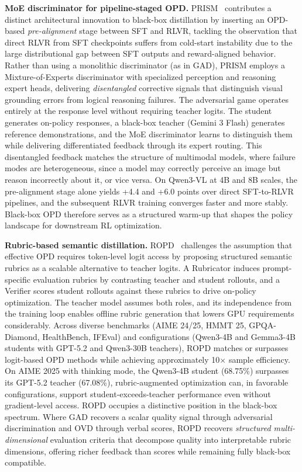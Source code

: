 \documentclass{article} %
\begin{document}
\textbf{MoE discriminator for pipeline-staged OPD.} PRISM~\citep{2604.28123} contributes a distinct architectural innovation to black-box distillation by inserting an OPD-based \emph{pre-alignment} stage between SFT and RLVR, tackling the observation that direct RLVR from SFT checkpoints suffers from cold-start instability due to the large distributional gap between SFT outputs and reward-aligned behavior. Rather than using a monolithic discriminator (as in GAD), PRISM employs a Mixture-of-Experts discriminator with specialized perception and reasoning expert heads, delivering \emph{disentangled} corrective signals that distinguish visual grounding errors from logical reasoning failures. The adversarial game operates entirely at the response level without requiring teacher logits. The student generates on-policy responses, a black-box teacher (Gemini 3 Flash) generates reference demonstrations, and the MoE discriminator learns to distinguish them while delivering differentiated feedback through its expert routing. This disentangled feedback matches the structure of multimodal models, where failure modes are heterogeneous, since a model may correctly perceive an image but reason incorrectly about it, or vice versa. On Qwen3-VL at 4B and 8B scales, the pre-alignment stage alone yields +4.4 and +6.0 points over direct SFT-to-RLVR pipelines, and the subsequent RLVR training converges faster and more stably. Black-box OPD therefore serves as a structured warm-up that shapes the policy landscape for downstream RL optimization.

\textbf{Rubric-based semantic distillation.} ROPD~\citep{2605.07396} challenges the assumption that effective OPD requires token-level logit access by proposing structured semantic rubrics as a scalable alternative to teacher logits. A Rubricator induces prompt-specific evaluation rubrics by contrasting teacher and student rollouts, and a Verifier scores student rollouts against these rubrics to drive on-policy optimization. The teacher model assumes both roles, and its independence from the training loop enables offline rubric generation that lowers GPU requirements considerably. Across diverse benchmarks (AIME 24/25, HMMT 25, GPQA-Diamond, HealthBench, IFEval) and configurations (Qwen3-4B and Gemma3-4B students with GPT-5.2 and Qwen3-30B teachers), ROPD matches or surpasses logit-based OPD methods while achieving approximately 10$\times$ sample efficiency. On AIME 2025 with thinking mode, the Qwen3-4B student (68.75\%) surpasses its GPT-5.2 teacher (67.08\%), rubric-augmented optimization can, in favorable configurations, support student-exceeds-teacher performance even without gradient-level access. ROPD occupies a distinctive position in the black-box spectrum. Where GAD recovers a scalar quality signal through adversarial discrimination and OVD through verbal scores, ROPD recovers \emph{structured multi-dimensional} evaluation criteria that decompose quality into interpretable rubric dimensions, offering richer feedback than scores while remaining fully black-box compatible.
\end{document}
